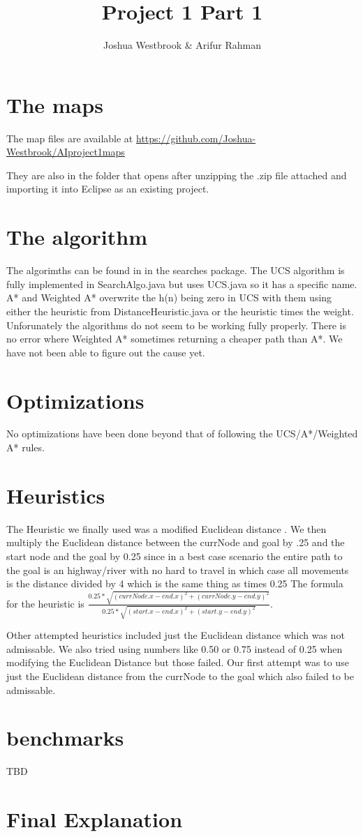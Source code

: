 \documentclass[11pt]{article} %
\title{Project 1 Part 1}
\author{Joshua Westbrook \& Arifur Rahman}
\date{} %
\begin{document}
\maketitle

\section{The maps}

The map files are available at \url{https://github.com/Joshua-Westbrook/AIproject1maps}

They are also in the folder that opens after unzipping the .zip file attached and importing it into Eclipse as an existing project.

\section{The algorithm}

The algorimths can be found in in the searches package. The UCS algorithm is fully implemented in SearchAlgo.java but uses UCS.java so it has a specific name. A* and Weighted A* overwrite the h(n) being zero in UCS with them using either the heuristic from DistanceHeuristic.java or the heuristic times the weight. Unforunately the algorithms do not seem to be working fully properly. There is no error where Weighted A* sometimes returning a cheaper path than A*. We have not been able to figure out the cause yet.

\section{Optimizations}
No optimizations have been done beyond that of following the UCS/A*/Weighted A* rules.

\section{Heuristics}
The Heuristic we finally used was a modified Euclidean distance . We then multiply the Euclidean distance between the currNode and goal by .25 and the start node and the goal by 0.25 since in a best case scenario the entire path to the goal is an highway/river with no hard to travel in which case all movements is the distance divided by 4 which is the same thing as times 0.25
The formula for the heuristic is $\frac{0.25 * \sqrt{(currNode.x - end.x)^2 + (currNode.y - end.y)^2}}{0.25 * \sqrt{(start.x - end.x)^2 + (start.y - end.y)^2}}$.

Other attempted heuristics included just the Euclidean distance which was not admissable. We also tried using numbers like 0.50 or 0.75 instead of 0.25 when modifying the Euclidean  Distance but those failed. Our first attempt was to use just the Euclidean distance from the currNode to the goal which also failed to be admissable.

\section{benchmarks}
TBD

\section{Final Explanation}
\end{document}
